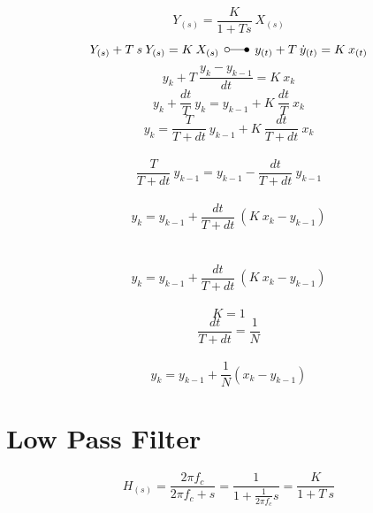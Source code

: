 \documentclass[
    10pt, %
    DIV12,
    english, %
    a5paper, %
    twoside, %
    titlepage, %
    parskip=half, %
    headings=small, %
    listof=totoc, %
    bibliography=totoc, %
    index=totoc, %
    captions=tableheading, %
    final %
]{scrbook}
\begin{document}
\begin{equation}
Y_{(s)} =  \frac{K}{1+T s} \: X_{(s)}\nonumber
\end{equation}
\begin{equation}
Y_{(s)}+ T \: s\: Y_{(s)} = K \:X_{(s)} \:\: \laplace \:\: y_{(t)}+T\:\dot{y}_{(t)}=K\: x_{(t)}\nonumber
\end{equation}
\begin{equation}
y_{k}+T\:\frac{y_k-y_{k-1}}{dt}=K\: x_k\nonumber
\end{equation}
\begin{equation}
y_{k}+\frac{dt}{T}\:y_k=y_{k-1}+K\:\frac{dt}{T}\:x_k\nonumber
\end{equation}
\begin{equation}
y_{k}=\frac{T}{T+dt}\:y_{k-1}+K\:\frac{dt}{T+dt}\:x_k\nonumber
\end{equation}
\\
\begin{equation}
\frac{T}{T+dt}\:y_{k-1}=y_{k-1}-\frac{dt}{T+dt}\:y_{k-1}\nonumber
\end{equation}
\\
\begin{equation}
y_{k}=y_{k-1}+\frac{dt}{T+dt}\:\left(K\:x_k-y_{k-1}\right)\nonumber
\end{equation}
\\
\\
\begin{equation}
y_{k}=y_{k-1}+\frac{dt}{T+dt}\:\left(K\:x_k-y_{k-1}\right)\nonumber
\end{equation}
\\
\begin{equation}
K=1\nonumber
\end{equation}
\begin{equation}
\frac{dt}{T+dt} = \frac{1}{N}\nonumber
\end{equation}
\\
\begin{equation}
y_{k}=y_{k-1}+\frac{1}{N}\left(x_{k}-y_{k-1}\right)\nonumber
\end{equation}


\section{Low Pass Filter}

\begin{equation}
H_{(s)} = \frac{2\pi f_c}{2\pi f_c+s}=\frac{1}{1+\frac{1}{2\pi f_c}s}= \frac{K}{1+T\:s} \nonumber
\end{equation}
\end{document}
